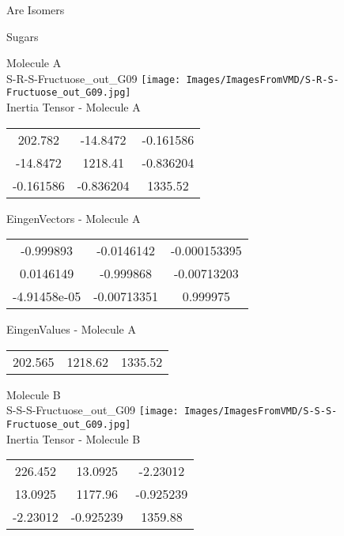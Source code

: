 \begin{center}
\vtab
\vtab
\textcolor{NavyBlue}{\Large Are Isomers}
\end{center}
\newpage

\vtab[-2cm]
\begin{center}
{\large Sugars}
\end{center}
\begin{multicols}{2}
\begin{center}
Molecule A \\ 
S-R-S-Fructuose\_out\_G09
\texttt{[image: Images/ImagesFromVMD/S-R-S-Fructuose\_out\_G09.jpg]}
\\
Inertia Tensor - Molecule A \\
\vtab
\begin{tabular}{|c c c|}
202.782	 & 	-14.8472	 & 	-0.161586	 \\
-14.8472	 & 	1218.41	 & 	-0.836204	 \\
-0.161586	 & 	-0.836204	 & 	1335.52
\end{tabular}

\vtab
 EingenVectors - Molecule A     \\
\vtab
\begin{tabular}{|c c c|}
-0.999893	 & 	-0.0146142	 & 	-0.000153395	 \\
0.0146149	 & 	-0.999868	 & 	-0.00713203	 \\
-4.91458e-05	 & 	-0.00713351	 & 	0.999975
\end{tabular}

\vtab
 EingenValues - Molecule A     \\
\vtab
\begin{tabular}{|c c c|}
202.565	 & 	1218.62	 & 	1335.52
\end{tabular}
\columnbreak

Molecule B \\ 
S-S-S-Fructuose\_out\_G09
\texttt{[image: Images/ImagesFromVMD/S-S-S-Fructuose\_out\_G09.jpg]}
\\
Inertia Tensor - Molecule B \\
\vtab
\begin{tabular}{|c c c|}
226.452	 & 	13.0925	 & 	-2.23012	 \\
13.0925	 & 	1177.96	 & 	-0.925239	 \\
-2.23012	 & 	-0.925239	 & 	1359.88
\end{tabular}


\end{center}
\end{multicols}
